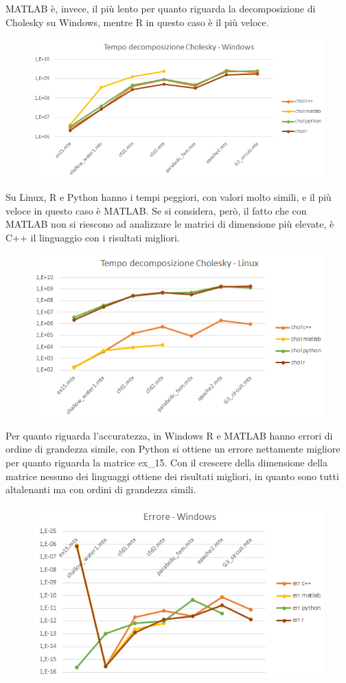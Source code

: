 \documentclass[a4paper,10pt]{article}
\begin{document}
MATLAB è, invece, il più lento per quanto riguarda la decomposizione di Cholesky su Windows, mentre R in questo caso è il più veloce.

\begin{figure}[H]
\centering
  \includegraphics[width=0.6\linewidth]{img/tempocholwin.png}
\end{figure}

Su Linux, R e Python hanno i tempi peggiori, con valori molto simili, e il più veloce in questo caso è MATLAB. Se si considera, però, il fatto che con MATLAB non si riescono ad analizzare le matrici di dimensione più elevate, è C++ il linguaggio con i risultati migliori.
\begin{figure}[H]
\centering
  \includegraphics[width=0.6\linewidth]{img/tempochollinux.png}
\end{figure}


Per quanto riguarda l'accuratezza, in Windows R e MATLAB hanno errori di ordine di grandezza simile, con Python si ottiene un errore nettamente migliore per quanto riguarda la matrice ex\_15. Con il crescere della dimensione della matrice nessuno dei linguaggi ottiene dei risultati migliori, in quanto sono tutti altalenanti ma con ordini di grandezza simili.

\begin{figure}[H]
\centering
  \includegraphics[width=0.5\linewidth]{img/errwin.png}
\end{figure}
\end{document}
